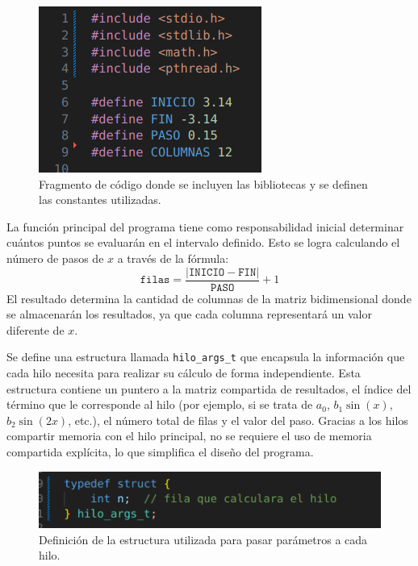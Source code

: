 {\begin{figure}[H]
    \centering
    \includegraphics[width=0.9\linewidth]{Figures/fase4/librerias_fase4.png}
    \caption{Fragmento de código donde se incluyen las bibliotecas y se definen las constantes utilizadas.}
    \label{fig:librerias-fase4}
\end{figure}

La función principal del programa tiene como responsabilidad inicial determinar cuántos puntos se evaluarán en el intervalo definido. Esto se logra calculando el número de pasos de $x$ a través de la fórmula: 
\[
\texttt{filas} = \frac{|\texttt{INICIO} - \texttt{FIN}|}{\texttt{PASO}} + 1
\]
El resultado determina la cantidad de columnas de la matriz bidimensional donde se almacenarán los resultados, ya que cada columna representará un valor diferente de $x$.

Se define una estructura llamada \texttt{hilo\_args\_t} que encapsula la información que cada hilo necesita para realizar su cálculo de forma independiente. Esta estructura contiene un puntero a la matriz compartida de resultados, el índice del término que le corresponde al hilo (por ejemplo, si se trata de $a_0$, $b_1\sin(x)$, $b_2\sin(2x)$, etc.), el número total de filas y el valor del paso. Gracias a los hilos compartir memoria con el hilo principal, no se requiere el uso de memoria compartida explícita, lo que simplifica el diseño del programa.

\begin{figure}[H]
    \centering
    \includegraphics[width=0.9\linewidth]{Figures/fase4/estructura_fase4.png}
    \caption{Definición de la estructura utilizada para pasar parámetros a cada hilo.}
    \label{fig:estructura-fase4}
\end{figure}

}
